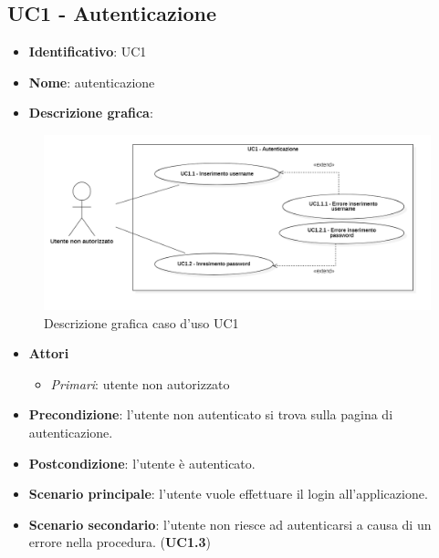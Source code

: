 
\subsection{UC1 - Autenticazione}
\begin{itemize}
  \item \textbf{Identificativo}: UC1
  \item \textbf{Nome}: autenticazione
  \item \textbf{Descrizione grafica}:
\end{itemize}

\begin{figure}[H]
  \centering
  \includegraphics[width=\textwidth]{immagini/usecase/UC1.png}
  \caption{Descrizione grafica caso d'uso UC1}
\end{figure}

\begin{itemize}
  \item \textbf{Attori}
        \begin{itemize}
          \item \textit{Primari}: utente non autorizzato
        \end{itemize}
  \item \textbf{Precondizione}: l'utente non autenticato si trova sulla pagina di autenticazione.
  \item \textbf{Postcondizione}: l'utente è autenticato.
  \item \textbf{Scenario principale}: l'utente vuole effettuare il login all'applicazione.
  \item \textbf{Scenario secondario}: l'utente non riesce ad autenticarsi a causa di un errore nella procedura. (\textbf{UC1.3})
\end{itemize}

